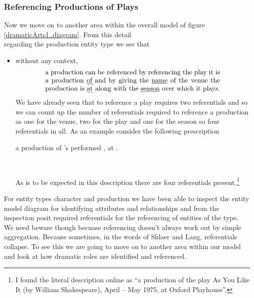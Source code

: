 \subsubsection{Referencing Productions of Plays}
Now we move on to another area within the overall model of figure \ref{dramaticArts1..diagram}. From this detail 
\begin{equation*}

\end{equation*}
regarding the production entity type  we see that
\begin{itemize}
  \item
  without any context, 
  \begin{equation} 
\label{absoluteCharacterReferencing}
\text{\parbox{9cm}{a production can be referenced by referencing the play it is a production \uwave{of} 
  and by giving the \underline{name} of the venue  the production is \uwave{at} along with the \underline{season} 
  over which it plays.}}
\end{equation}
We have already seen that to reference a play requires two referentials and so
we can count up the number of referentials required to reference a production
  as one for the venue, two for the play and one for the season so four referentials in all. 
As an example consider the following prescription
\begin{erquote}
\parbox{9cm}{a production of \mbox{'s} 
 performed \mbox{,} at .}\\
\end{erquote}
As is to be expected in this description there are four referentials present.\footnote{
I found the literal description online as ``a production of the play As You Like It (by William Shakespeare), April – May 1975, at Oxford Playhouse''.  
} 
\end{itemize}
For entity types character and production we have been able to inspect the entity model diagram for identifying  attributes and relationships and from the inspection posit required referentials  for the referencing of entities of the type.
We need beware though becuase referencing doesn't always work out by simple aggregation. Because sometimes,
in the words of Shlaer and Lang, referentials collapse. 
To see this we are going to move on to another area within our model and look at how dramatic roles are identified and referenced.
